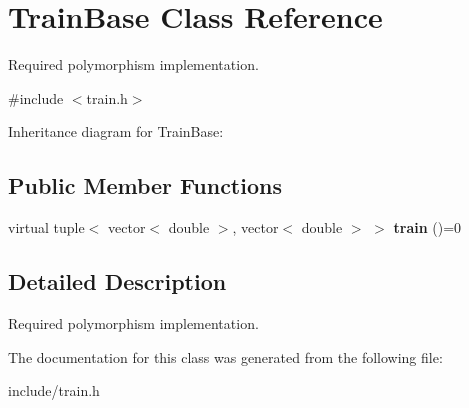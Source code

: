\hypertarget{class_train_base}{}\section{Train\+Base Class Reference}
\label{class_train_base}


Required polymorphism implementation.  




{\ttfamily \#include $<$train.\+h$>$}



Inheritance diagram for Train\+Base\+:
\subsection*{Public Member Functions}
\begin{DoxyCompactItemize}
\item 
\mbox{\label{class_train_base_acdae4d4582726a5323dd8a89cc115e2b}} 
virtual tuple$<$ vector$<$ double $>$, vector$<$ double $>$ $>$ {\bfseries train} ()=0
\end{DoxyCompactItemize}


\subsection{Detailed Description}
Required polymorphism implementation. 

The documentation for this class was generated from the following file\+:\begin{DoxyCompactItemize}
\item 
include/train.\+h\end{DoxyCompactItemize}
